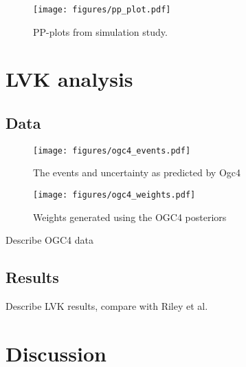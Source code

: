 \documentclass[twocolumn]{aastex631}
\begin{document}
\begin{figure}[ht!]
    \begin{centering}
        \texttt{[image: figures/pp\_plot.pdf]}
        \caption{
            PP-plots from simulation study.
        }
        \label{fig:pp_plot}
    \end{centering}
\end{figure}


\section{LVK analysis}
\subsection{Data}

\begin{figure}[ht!]
    \begin{centering}
        \texttt{[image: figures/ogc4\_events.pdf]}
        \caption{
            The events and uncertainty as predicted by Ogc4
        }
        \label{fig:ogc4_events}
    \end{centering}
\end{figure}

\begin{figure}[ht!]
    \begin{centering}
        \texttt{[image: figures/ogc4\_weights.pdf]}
        \caption{
            Weights generated using the OGC4 posteriors
        }
        \label{fig:ogc4_weights}
    \end{centering}
\end{figure}

Describe OGC4 data

\subsection{Results}
Describe LVK results, compare with Riley et al.

\section{Discussion}



\end{document}
